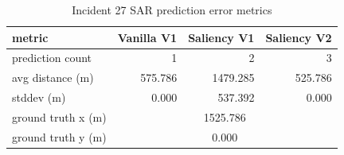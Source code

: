 \begin{table}[ht]
\centering
\caption{Incident 27 SAR prediction error metrics}
\label{tab:sar-incident-27}
\begin{tabular}{lrrr}
\hline
metric & Vanilla V1 & Saliency V1 & Saliency V2 \\
\hline
prediction count & 1 & 2 & 3 \\
avg distance (m) & 575.786 & 1479.285 & 525.786 \\
stddev (m) & 0.000 & 537.392 & 0.000 \\
ground truth x (m) & \multicolumn{3}{c}{1525.786} \\
ground truth y (m) & \multicolumn{3}{c}{0.000} \\
\hline
\end{tabular}
\end{table}
